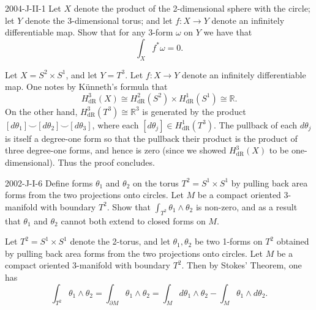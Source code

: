 \documentclass{article}
\begin{document}
	\begin{prb}{2004-J-II-1}
		Let $X$ denote the product of the 2-dimensional sphere with the circle; let $Y$ denote the 3-dimensional torus; and let $f: X \to Y$ denote an infinitely differentiable map. Show that for any 3-form $\omega$ on $Y$ we have that 
		\begin{equation*}
			\int_{X}f^{\ast}\omega = 0. 
		\end{equation*}
	\end{prb}
	Let $X = S^{2} \times S^{1}$, and let $Y = T^{3}$. Let $f: X \to Y$ denote an infinitely differentiable map. One notes by K\"unneth's formula that 
	\begin{equation*}
		H^{3}_{\text{dR}}(X) \cong H^{2}_{\text{dR}}(S^{2}) \times H^{1}_{\text{dR}}(S^{1}) \cong \mathbb{R}. 
	\end{equation*}
	On the other hand, $H^{3}_{\text{dR}}(T^{3}) \cong \mathbb{R}^{3}$ is generated by the product $[d\theta_{1}] \smile [d\theta_{2}] \smile [d\theta_{3}]$, where each $[d\theta_{j}] \in H^{1}_{\text{dR}}(T^3)$. The pullback of each $d\theta_{j}$ is itself a degree-one form so that the pullback their product is the product of three degree-one forms, and hence is zero (since we showed $H^{3}_{\text{dR}}(X)$ to be one-dimensional). Thus the proof concludes. 
	
	\begin{prb}{2002-J-I-6}
		Define forms $\theta_{1}$ and $\theta_{2}$ on the torus $T^{2} = S^{1} \times S^{1}$ by pulling back area forms from the two projections onto circles. Let $M$ be a compact oriented 3-manifold with boundary $T^{2}$. Show that $\int_{T^{2}}\theta_{1} \wedge \theta_{2}$ is non-zero, and as a result that $\theta_{1}$ and $\theta_{2}$ cannot both extend to closed forms on $M$. 
	\end{prb}
	Let $T^{2} = S^{1} \times S^{1}$ denote the 2-torus, and let $\theta_{1}, \theta_{2}$ be two 1-forms on $T^{2}$ obtained by pulling back area forms from the two projections onto circles. Let $M$ be a compact oriented 3-manifold with boundary $T^{2}$. Then by Stokes' Theorem, one has 
	\begin{equation*}
		\int_{T^{2}}\theta_{1} \wedge \theta_{2} = \int_{\partial M}\theta_{1} \wedge \theta_{2} = \int_{M}d\theta_{1} \wedge \theta_{2} - \int_{M}\theta_{1} \wedge d\theta_{2}. 
	\end{equation*}
	
\end{document}
